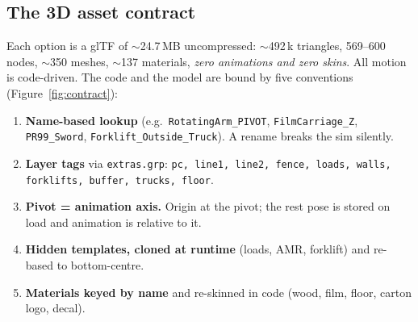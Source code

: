 \documentclass[11pt,a4paper]{article}
\begin{document}
\subsection{The 3D asset contract}

Each option is a glTF of ${\sim}$24.7\,MB uncompressed: ${\sim}$492\,k triangles, 569--600 nodes, ${\sim}$350 meshes,
${\sim}$137 materials, \emph{zero animations and zero skins}. All motion is code-driven.
The code and the model are bound by five conventions (Figure~\ref{fig:contract}):

\begin{enumerate}[leftmargin=*,itemsep=2pt]
  \item \textbf{Name-based lookup} (e.g.\ \texttt{RotatingArm\_PIVOT}, \texttt{FilmCarriage\_Z},
        \texttt{PR99\_Sword}, \texttt{Forklift\_Outside\_Truck}). A rename breaks the sim silently.
  \item \textbf{Layer tags} via \texttt{extras.grp}: \texttt{pc, line1, line2, fence, loads, walls, forklifts, buffer, trucks, floor}.
  \item \textbf{Pivot = animation axis.} Origin at the pivot; the rest pose is stored on load and animation is relative to it.
  \item \textbf{Hidden templates, cloned at runtime} (loads, AMR, forklift) and re-based to bottom-centre.
  \item \textbf{Materials keyed by name} and re-skinned in code (wood, film, floor, carton logo, decal).
\end{enumerate}
\end{document}
